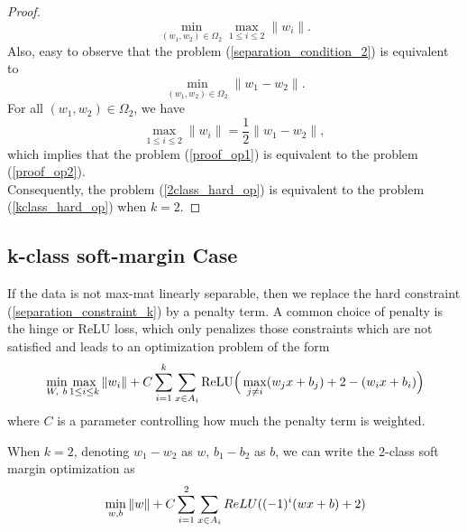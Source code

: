 \begin{proof}
\begin{equation}\label{proof_op1}
	\min_{(w_1,w_2)\in\Omega_2} \max_{1\leq i\leq 2}\|w_i\|.
\end{equation}
Also, easy to observe that the problem (\ref{separation_condition_2}) is equivalent to 
\begin{equation}\label{proof_op2}
\min_{(w_1,w_2)\in \Omega_2} \| w_1-w_2\|.
\end{equation}
For all $(w_1,w_2)\in \Omega_2$, we have
\begin{equation}
	\max_{1\leq i\leq 2}\|w_i\| = \frac{1}{2} \| w_1-w_2\|,
\end{equation}
which implies that the problem (\ref{proof_op1}) is equivalent to the problem (\ref{proof_op2}). \\
Consequently, the problem (\ref{2class_hard_op}) is equivalent to the problem (\ref{kclass_hard_op}) when $k=2$.
\end{proof}

\subsection{k-class soft-margin Case}
If the data is not max-mat linearly separable, then we replace the hard constraint (\ref{separation_constraint_k})
by a penalty term. A common choice of penalty is the hinge or ReLU loss, which only penalizes those constraints which are
not satisfied and leads to an optimization problem of the form
\begin{equation}{\label{kclass_soft_op}}
 \min_{W,~b}\max_{1\leq i\leq k}\|w_i\| + C\displaystyle\sum_{i=1}^k\displaystyle\sum_{x\in A_i}\text{ReLU}\Big( \max_{j\neq i} (w_jx + b_j) + 2 - (w_ix+b_i)\Big)
\end{equation}
where $C$ is a parameter controlling how much the penalty term is weighted.

When $k =2$, denoting $w_1-w_2$ as $w$, $b_1-b_2$ as $b$, we can write the 2-class soft margin optimization as 
\begin{equation}{\label{2-class soft-margin optimization}}
\min_{w,b} \|w\| + C\sum_{i=1}^2 \sum_{x\in A_i} ReLU((-1)^i (wx+b)+2)
\end{equation}

